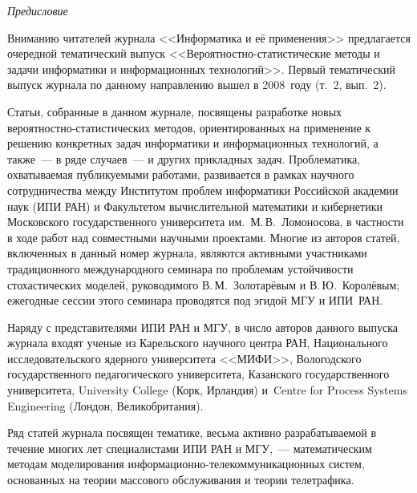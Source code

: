 { %
{ %

\vspace*{-48pt}
\begin{center}\LARGE
\textit{Предисловие}
\end{center}


\vspace*{15mm}

\thispagestyle{empty}

{ %
Вниманию читателей журнала <<Информатика и её применения>> предлагается очередной 
тематический выпуск <<Вероятностно-статистические методы и задачи информатики и информационных технологий>>. 
Первый тематический выпуск журнала по данному направлению вышел в 2008~году (т.~2, вып.~2). 

Статьи, собранные в данном журнале, посвящены разработке новых вероятностно-статистических методов, ориентированных 
на применение к решению конкретных задач информатики и информационных технологий, а также~--- в ряде случаев~--- 
и других прикладных задач. Проблематика, охватываемая публикуемыми работами, развивается в рамках научного 
сотрудничества между Институтом проблем информатики Российской академии наук (ИПИ РАН) и Факультетом вычислительной 
математики и кибернетики Московского государственного университета им.~М.\,В.~Ломоносова, в частности в ходе работ 
над совместными научными проектами. Многие из авторов статей, включенных в данный номер журнала, являются 
активными участниками традиционного международного семинара по проблемам устойчивости стохастических моделей, 
руководимого В.\,М.~Золотарёвым и В.\,Ю.~Королёвым; ежегодные сессии этого семинара проводятся под эгидой МГУ и ИПИ~РАН. 

Наряду с представителями ИПИ РАН и МГУ, в число авторов данного выпуска журнала входят ученые из Карельского научного 
центра РАН, Национального исследовательского ядерного университета <<МИФИ>>, Вологодского государственного 
педагогического университета, Казанского государственного университета, University College (Корк, Ирландия) 
и~Centre for Process Systems Engineering (Лондон, Великобритания).

Ряд статей журнала посвящен тематике, весьма активно разрабатываемой в течение многих лет специалистами ИПИ 
РАН и МГУ,~--- математическим методам моделирования информационно-те\-ле\-ком\-му\-ни\-ка\-ци\-он\-ных систем, основанных 
на теории массового обслуживания и теории телетрафика. 

}}}
